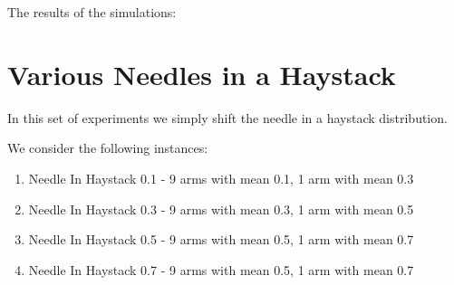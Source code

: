 \documentclass[11pt,letterpaper]{article}
\begin{document}
The results of the simulations:




\section*{Various Needles in a Haystack}
In this set of experiments we simply shift the needle in a haystack distribution.

We consider the following instances:
\begin{enumerate}
\item Needle In Haystack 0.1 - 9 arms with mean 0.1, 1 arm with mean 0.3
\item Needle In Haystack 0.3 - 9 arms with mean 0.3, 1 arm with mean 0.5
\item Needle In Haystack 0.5 - 9 arms with mean 0.5, 1 arm with mean 0.7
\item Needle In Haystack 0.7 - 9 arms with mean 0.5, 1 arm with mean 0.7
\end{enumerate}
\end{document}
